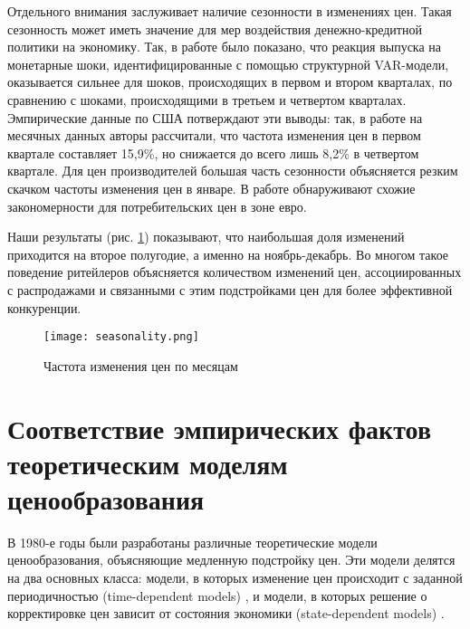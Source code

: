 % 

Отдельного внимания заслуживает наличие сезонности в изменениях цен. Такая сезонность может иметь значение для мер воздействия денежно-кредитной политики на экономику. Так, в работе \cite{olivei2007} было показано, что реакция выпуска на монетарные шоки, идентифицированные с помощью структурной VAR-модели, оказывается сильнее для шоков, происходящих в первом и втором кварталах, по сравнению с шоками, происходящими в третьем и четвертом кварталах. Эмпирические данные по США потверждают эти выводы: так, в работе \cite{Nakamura2008} на месячных данных авторы рассчитали, что частота изменения цен в первом квартале составляет 15,9\%, но снижается до всего лишь 8,2\% в четвертом квартале. Для цен производителей большая часть сезонности объясняется резким скачком частоты изменения цен в январе. В работе \cite{alvarez2006sticky} обнаруживают схожие закономерности для потребительских цен в зоне евро.

Наши результаты (рис. \ref{fig:seasonality}) показывают, что наибольшая доля изменений приходится на второе полугодие, а именно на ноябрь-декабрь. Во многом такое поведение ритейлеров объясняется количеством изменений цен, ассоциированных с распродажами и связанными с этим подстройками цен для более эффективной конкуренции.

\begin{figure}[h]
	\centering
	\texttt{[image: seasonality.png]} %
	\caption{Частота изменения цен по месяцам} %
	\label{fig:seasonality} %
\end{figure}
 

\section{Соответствие эмпирических фактов теоретическим моделям ценообразования}\label{sec:ch3/sec3}

	
	В 1980-е годы были разработаны различные теоретические модели ценообразования, объясняющие медленную подстройку цен. Эти модели делятся на два основных класса: модели, в которых изменение цен происходит с заданной периодичностью (time-dependent models) \cite{Calvo1983, Taylor1980}, и модели, в которых решение о корректировке цен зависит от состояния экономики (state-dependent models) \cite{CaplinSpulber1987, Dotsey1999, Rotemberg1982}. 
	
